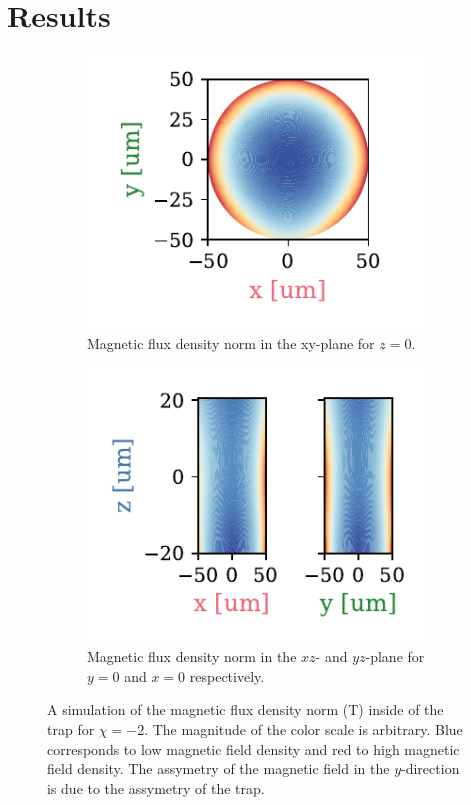 \chapter{Results}
\label{chap:results}

\begin{figure}
    \centering
    \begin{subfigure}[t]{0.45\textwidth}
        \includegraphics{figures/magnetic_field_distribution_in_trap_horizontal.pdf}
        \caption{Magnetic flux density norm in the xy-plane for $z = 0$.}
        \vfill
    \end{subfigure}
    \hfill
    \begin{subfigure}[t]{0.45\textwidth}
        \includegraphics{figures/magnetic_field_distribution_in_trap_vertical.pdf}
        \caption{Magnetic flux density norm in the $xz$- and $yz$-plane for $y = 0$ and $x=0$ respectively.}
    \end{subfigure}
    \caption{A simulation of the magnetic flux density norm (\unit{\tesla}) inside of the trap for $\chi = -2$. The magnitude of the color scale is arbitrary. Blue corresponds to low magnetic field density and red to high magnetic field density. The assymetry of the magnetic field in the $y$-direction is due to the assymetry of the trap.}
    \label{fig:magnetic_field_distribution_in_trap}
\end{figure}

